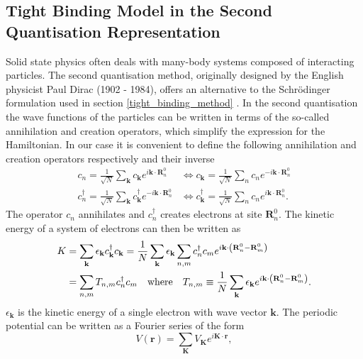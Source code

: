 \subsection{Tight Binding Model in the Second Quantisation Representation}\label{second_quant_repr}

Solid state physics often deals with many-body systems composed of interacting particles. The second quantisation method, originally designed by the English physicist Paul Dirac (1902 - 1984), offers an alternative to the Schrödinger formulation used in section \ref{tight_binding_method} \cite{Beale2020}. In the second quantisation the wave functions of the particles can be written in terms of the so-called annihilation and creation operators, which simplify the expression for the Hamiltonian. In our case it is convenient to define the following annihilation and creation operators respectively and their inverse \cite{Quinn2018}
\begin{equation}
\begin{split}
    c_n = \frac{1}{\sqrt{N}}\sum_\mathbf{k}c_\mathbf{k} e^{i\mathbf{k}\cdot\mathbf{R}_n^0} &\iff c_\mathbf{k} = \frac{1}{\sqrt{N}}\sum_n c_n e^{-i\mathbf{k}\cdot\mathbf{R}_n^0}\\
    c_n^\dagger = \frac{1}{\sqrt{N}}\sum_\mathbf{k}c_\mathbf{k}^\dagger e^{-i\mathbf{k}\cdot\mathbf{R}_n^0} &\iff c_\mathbf{k}^\dagger = \frac{1}{\sqrt{N}}\sum_n c_n e^{i\mathbf{k}\cdot\mathbf{R}_n^0}.
\end{split}
\end{equation}
The operator $c_n$ annihilates and $c_n^\dagger$ creates electrons at site $\mathbf{R}_n^0$. The kinetic energy of a system of electrons can then be written as \cite{Quinn2018}
\begin{equation}\label{eq:K}
\begin{split}
    K &= \sum_\mathbf{k}\epsilon_\mathbf{k}c_\mathbf{k}^\dagger c_\mathbf{k} =\frac{1}{N} \sum_\mathbf{k}\epsilon_\mathbf{k}\sum_{n,m}c_n^\dagger c_m e^{i\mathbf{k}\cdot\left(\mathbf{R}_n^0-\mathbf{R}_m^0\right)}\\
    &= \sum_{n,m}T_{n,m} c_n^\dagger c_m \quad \mathrm{where} \quad T_{n,m} \equiv \frac{1}{N}\sum_\mathbf{k}\epsilon_\mathbf{k}e^{i\mathbf{k}\cdot\left(\mathbf{R}_n^0-\mathbf{R}_m^0\right)}.
\end{split}
\end{equation}
$\epsilon_\mathbf{k}$ is the kinetic energy of a single electron with wave vector $\mathbf{k}$. The periodic potential can be written as a Fourier series of the form \cite{Quinn2018}
\begin{equation}\label{eq:V_r}
    V(\mathbf{r})=\sum_{\mathbf{K}} V_\mathbf{K}e^{i\mathbf{K}\cdot\mathbf{r}},
\end{equation}
